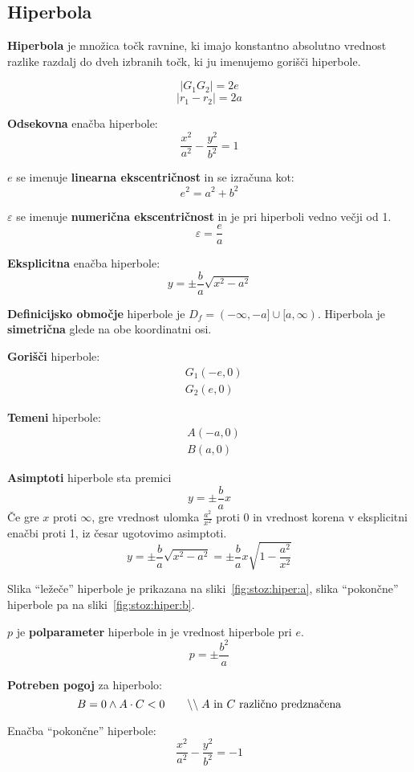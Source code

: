 \documentclass[a4paper,oneside,12pt,fleqn]{article}
\newcommand\krat\cdot
\newcommand{\comment}[1]{\ensuremath{\qquad\backslash\backslash\;}\textnormal{#1}}
\numberwithin{equation}{section}
\begin{document}
\subsection{Hiperbola}
\label{sec:stoz:hiper}
\textbf{Hiperbola} je množica točk ravnine, ki imajo konstantno absolutno vrednost razlike razdalj
do dveh izbranih točk, ki ju imenujemo gorišči hiperbole.

\[ |G_1G_2| = 2e \]
\[ |r_1 - r_2| = 2a \]

\textbf{Odsekovna} enačba hiperbole:
\[ \frac{x^2}{a^2} - \frac{y^2}{b^2} = 1 \]

$e$ se imenuje \textbf{linearna ekscentričnost} in se izračuna kot:
\[ e^2 = a^2 + b^2 \]

$\varepsilon$ se imenuje \textbf{numerična ekscentričnost} in je pri hiperboli vedno večji od 1.
\[ \varepsilon = \frac{e}{a} \]

\textbf{Eksplicitna} enačba hiperbole:
\[ y = \pm \frac{b}{a} \sqrt{x^2 - a^2} \]

\textbf{Definicijsko območje} hiperbole je $D_f = (-\infty, -a] \cup [a, \infty)$.
Hiperbola je \textbf{simetrična} glede na obe koordinatni osi.

\textbf{Gorišči} hiperbole:
\begin{align*}
 &G_1(-e, 0) \\
 &G_2(e, 0)
\end{align*}

\textbf{Temeni} hiperbole:
\begin{align*}
  &A(-a, 0) \\
  &B(a, 0)
\end{align*}

\textbf{Asimptoti} hiperbole sta premici
\[ y = \pm \frac{b}{a}x \]
Če gre $x$ proti $\infty$, gre vrednost ulomka $\frac{a^2}{x^2}$ proti 0 in vrednost korena v eksplicitni enačbi proti 1, iz česar
ugotovimo asimptoti.
\[ y = \pm \frac{b}{a} \sqrt{x^2 - a^2}  = \pm \frac{b}{a} x \sqrt{1 -\frac{a^2}{x^2}} \]

Slika ``ležeče'' hiperbole je prikazana na sliki~\ref{fig:stoz:hiper:a}, slika
``pokončne'' hiperbole pa na sliki~\ref{fig:stoz:hiper:b}.

$p$ je \textbf{polparameter} hiperbole in je vrednost hiperbole pri $e$.
\[ p = \pm \frac{b^2}{a} \]

\textbf{Potreben pogoj} za hiperbolo:
\[ B = 0 \land A \krat C < 0 \comment{$A$ in $C$ različno predznačena} \]

Enačba ``pokončne'' hiperbole:
\[ \frac{x^2}{a^2} - \frac{y^2}{b^2} = -1 \]
\end{document}
